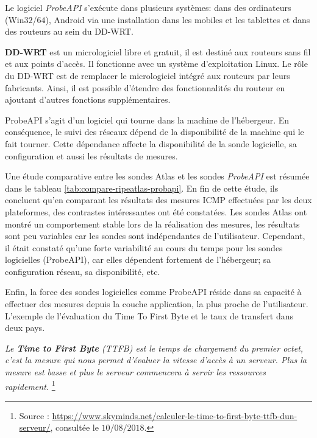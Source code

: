 Le logiciel \textit{ProbeAPI}  s'exécute dans plusieurs systèmes: dans des ordinateurs (Win$32$/$64$), Android via une installation dans les mobiles et les tablettes et   dans des routeurs au sein du DD-WRT.

\begin{tcolorbox}
	\textbf{DD-WRT} est un micrologiciel libre et gratuit, il est destiné aux routeurs sans fil et aux points d'accès. Il fonctionne  avec un système d'exploitation Linux. Le rôle du DD-WRT est de remplacer le micrologiciel intégré aux routeurs par leurs fabricants. Ainsi, il est possible  d'étendre des fonctionnalités du routeur en ajoutant d'autres fonctions supplémentaires.
\end{tcolorbox}


ProbeAPI s'agit d'un logiciel qui tourne dans la machine de l'hébergeur. En conséquence, le suivi des réseaux dépend de la disponibilité de la machine qui le fait  tourner. Cette dépendance  affecte la disponibilité de la sonde logicielle, sa configuration et aussi les résultats de mesures.

Une étude comparative \cite{COMPARE-ATLAS-PROBEAPI}  entre les sondes  Atlas et les sondes \textit{ProbeAPI} est résumée dans le tableau \ref{tab:compare-ripeatlas-probapi}. 
En fin de cette étude, ils concluent qu'en comparant les résultats des mesures ICMP effectuées par les deux plateformes, des contrastes intéressantes ont été constatées.  Les sondes Atlas ont montré un comportement stable lors de la réalisation  des mesures, les résultats sont peu variables car les sondes sont indépendantes de l'utilisateur. Cependant, il était constaté qu'une forte variabilité au cours du temps pour les sondes logicielles (ProbeAPI), car elles dépendent fortement de l'hébergeur; sa configuration réseau, sa disponibilité, etc.

Enfin, la force des sondes logicielles comme  ProbeAPI réside dans sa capacité  à effectuer des mesures depuis la couche application, la plus proche de l'utilisateur. L'exemple de l'évaluation du Time To First Byte et le taux de transfert dans deux pays.

\begin{tcolorbox}
	\og \textit{	Le \textbf{Time to First Byte} (TTFB) est le temps de chargement du premier octet, c'est la mesure qui nous permet d'évaluer la vitesse d'accès à un serveur. Plus la mesure est basse et plus le serveur commencera à servir les ressources rapidement.} \fg{} \footnote{Source : \url{https://www.skyminds.net/calculer-le-time-to-first-byte-ttfb-dun-serveur/}, consultée le $10/08/2018$.}
\end{tcolorbox}

